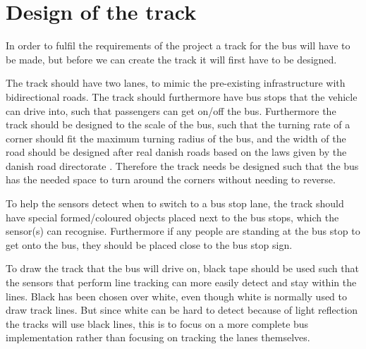 \section{Design of the track} 

In order to fulfil the requirements of the project a track for the bus will have to be made, but before we can create the track it will first have to be designed.

The track should have two lanes, to mimic the pre-existing infrastructure with bidirectional roads. The track should furthermore have bus stops that the vehicle can drive into, such that passengers can get on/off the bus.
Furthermore the track should be designed to the scale of the bus, such that the turning rate of a corner should fit the maximum turning radius of the bus, and the width of the road should be designed after real danish roads based on the laws given by the danish road directorate \cite{roadRules}\cite{DriveingCurves}. Therefore the track needs be designed such that the bus has the needed space to turn around the corners without needing to reverse.

To help the sensors detect when to switch to a bus stop lane, the track should have special formed/coloured objects placed next to the bus stops, which the sensor(s) can recognise. Furthermore if any people are standing at the bus stop to get onto the bus, they should be placed close to the bus stop sign.

To draw the track that the bus will drive on, black tape should be used such that the sensors that perform line tracking can more easily detect and stay within the lines. Black has been chosen over white, even though white is normally used to draw track lines. But since white can be hard to detect because of light reflection the tracks will use black lines, this is to focus on a more complete bus implementation rather than focusing on tracking the lanes themselves.